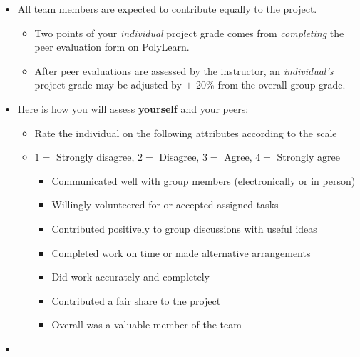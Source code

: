 \documentclass[letterpaper,12pt]{report}
\begin{document}
\begin{itemize}
    \item All team members are expected to contribute equally to the project.
    \begin{itemize}
    \item Two points of your \emph{individual} project grade comes from \emph{completing} the peer evaluation form on PolyLearn.
    \item  After peer evaluations are assessed by the instructor, an \emph{individual's} project grade may be adjusted by $\pm$ 20\% from the overall group grade.
    \end{itemize}
    \item
    Here is how you will assess \textbf{yourself} and your peers:
    \begin{itemize}
    \item[] Rate the individual on the following attributes according to the scale
    \item[] $1=$ Strongly disagree, $2=$ Disagree, $3=$ Agree, $4=$ Strongly agree
    \begin{itemize}
    \item Communicated well with group members (electronically or in person)
    \item Willingly volunteered for or accepted assigned tasks
    \item Contributed positively to group discussions with useful ideas
    \item Completed work on time or made alternative arrangements
    \item Did work accurately and completely
    \item Contributed a fair share to the project
    \item Overall was a valuable member of the team
    \end{itemize}
    \end{itemize}
    \item[]
\end{itemize}
\end{document}
